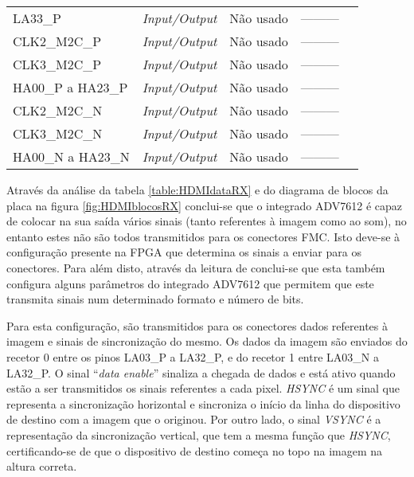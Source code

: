 \begin{table}[h!]
{\begin{tabular}{@{}lllll@{}}
			LA33\_P              & \textit{Input/Output}          & Não usado              & ---------                     \\ 
			CLK2\_M2C\_P         & \textit{Input/Output}          & Não usado              & ---------                     \\ 
			CLK3\_M2C\_P         & \textit{Input/Output}          & Não usado              & ---------                     \\ 
			HA00\_P a HA23\_P    & \textit{Input/Output}          & Não usado              & ---------                     \\ 
			CLK2\_M2C\_N         & \textit{Input/Output}          & Não usado              & ---------                     \\ 
			CLK3\_M2C\_N         & \textit{Input/Output}          & Não usado              & ---------                     \\ 
			HA00\_N a HA23\_N    & \textit{Input/Output}          & Não usado              & ---------                     \\ \bottomrule	
		\end{tabular}}		
		\centering

	\end{table}

Através da análise da tabela \ref{table:HDMIdataRX} e do diagrama de blocos da placa na figura \ref{fig:HDMIblocosRX} conclui-se que o integrado ADV7612 é capaz de colocar na sua saída vários sinais (tanto referentes à imagem como ao som), no entanto estes não são todos transmitidos para os conectores FMC. Isto deve-se à configuração presente na FPGA que determina os sinais a enviar para os conectores. Para além disto, através da leitura de \cite{R016} conclui-se que esta também configura alguns parâmetros do integrado ADV7612 que permitem que este transmita sinais num determinado formato e número de bits. 

Para esta configuração, são transmitidos para os conectores dados referentes à imagem e sinais de sincronização do mesmo. Os dados da imagem são enviados do recetor 0 entre os pinos LA03\_P a LA32\_P, e do recetor 1  entre LA03\_N a LA32\_P. O sinal “\textit{data enable}” sinaliza a chegada de dados e está ativo quando estão a ser transmitidos os sinais referentes a cada pixel. \textit{HSYNC} é um sinal que representa a sincronização horizontal e sincroniza o início da linha do dispositivo de destino com a imagem que o originou. Por outro lado, o sinal \textit{VSYNC} é a representação da sincronização vertical, que tem a mesma função que \textit{HSYNC}, certificando-se de que o dispositivo de destino começa no topo na imagem na altura correta.

